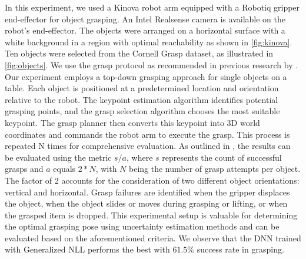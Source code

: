 \documentclass[letterpaper, 10 pt, conference]{ieeeconf}  %
\begin{document}
In this experiment, we used a Kinova robot arm equipped with a Robotiq gripper end-effector for object grasping.  An Intel Realsense camera is available on the robot's end-effector. The objects were arranged on a horizontal surface with a white background in a region with optimal reachability as shown in \cref{fig:kinova}. Ten objects were selected from the Cornell Grasp dataset, as illustrated in \cref{fig:objects}.
We use the grasp protocol as recommended in previous research by \cite{bekiroglu2019benchmarking}. 
Our experiment employs a top-down grasping approach for single objects on a table. Each object is positioned at a predetermined location and orientation relative to the robot. 
The keypoint estimation algorithm identifies potential grasping points, and the grasp selection algorithm chooses the most suitable keypoint. The grasp planner then converts this keypoint into 3D world coordinates and commands the robot arm to execute the grasp. This process is repeated N times for comprehensive evaluation.
As outlined in \cite{bekiroglu2019benchmarking}, the results can be evaluated using the metric $s/a$, where $s$ represents the count of successful grasps and $a$ equals $2 * N$, with $N$ being the number of grasp attempts per object. The factor of 2 accounts for the consideration of two different object orientations: vertical and horizontal. Grasp failures are identified when the gripper displaces the object, when the object slides or moves during grasping or lifting, or when the grasped item is dropped. This experimental setup is valuable for determining the optimal grasping pose using uncertainty estimation methods and can be evaluated based on the aforementioned criteria.
We observe that the DNN trained with Generalized NLL performs the best with $61.5 \%$ success rate in grasping.
%	
\end{document}
